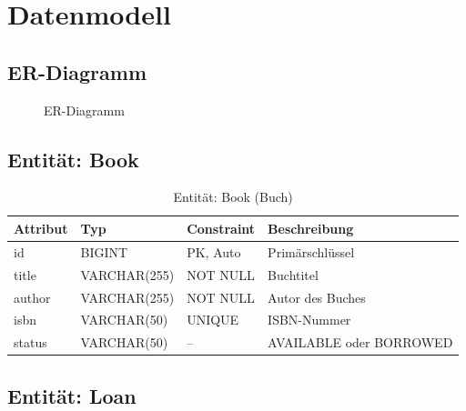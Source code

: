 \documentclass[a4paper,12pt,twoside]{report}
\begin{document}
\newpage

\section{Datenmodell}

\subsection{ER-Diagramm}

\begin{figure}[H]
\centering
{}
\caption{ER-Diagramm}
\label{fig:er}
\end{figure}

\newpage

\subsection{Entität: Book}

\begin{table}[H]
\centering
\caption{Entität: Book (Buch)}
\begin{tabularx}{\textwidth}{l l l X}
\toprule
\textbf{Attribut} & \textbf{Typ} & \textbf{Constraint} & \textbf{Beschreibung} \\
\midrule
id & BIGINT & PK, Auto & Primärschlüssel \\
title & VARCHAR(255) & NOT NULL & Buchtitel \\
author & VARCHAR(255) & NOT NULL & Autor des Buches \\
isbn & VARCHAR(50) & UNIQUE & ISBN-Nummer \\
status & VARCHAR(50) & -- & AVAILABLE oder BORROWED \\
\bottomrule
\end{tabularx}
\end{table}

\subsection{Entität: Loan}
\end{document}
